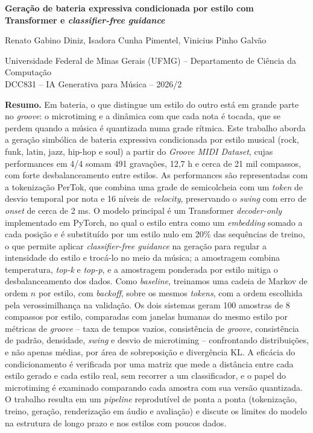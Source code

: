 \documentclass[11pt,a4paper]{article}
\begin{document}
\begin{center}
{\large\bfseries Geração de bateria expressiva condicionada por estilo com Transformer e \textit{classifier-free guidance}}

\vspace{0.6em}
Renato Gabino Diniz, Isadora Cunha Pimentel, Vinicius Pinho Galvão

Universidade Federal de Minas Gerais (UFMG) -- Departamento de Ciência da Computação\\
DCC831 -- IA Generativa para Música -- 2026/2
\end{center}

\vspace{0.4em}
\textbf{Resumo.}
Em bateria, o que distingue um estilo do outro está em grande parte no \textit{groove}: o microtiming e a dinâmica com
que cada nota é tocada, que se perdem quando a música é quantizada numa grade rítmica. Este trabalho aborda a geração
simbólica de bateria expressiva condicionada por estilo musical (rock, funk, latin, jazz, hip-hop e soul) a partir do
\textit{Groove MIDI Dataset}, cujas performances em 4/4 somam 491 gravações, 12,7 h e cerca de 21 mil compassos,
com forte desbalanceamento entre estilos. As performances são representadas com a tokenização PerTok, que combina uma
grade de semicolcheia com um \textit{token} de desvio temporal por nota e 16 níveis de \textit{velocity}, preservando
o \textit{swing} com erro de \textit{onset} de cerca de 2 ms. O modelo principal é um Transformer
\textit{decoder-only} implementado em PyTorch, no qual o estilo entra como um \textit{embedding} somado a cada posição
e é substituído por um estilo nulo em 20\% das sequências de treino, o que permite aplicar \textit{classifier-free
guidance} na geração para regular a intensidade do estilo e trocá-lo no meio da música; a amostragem combina
temperatura, \textit{top-k} e \textit{top-p}, e a amostragem ponderada por estilo mitiga o desbalanceamento dos dados.
Como \textit{baseline}, treinamos uma cadeia de Markov de ordem $n$ por estilo, com \textit{backoff}, sobre os mesmos
\textit{tokens}, com a ordem escolhida pela verossimilhança na validação. Os dois sistemas geram 100 amostras de
8 compassos por estilo, comparadas com janelas humanas do mesmo estilo por métricas de \textit{groove} --
taxa de tempos vazios, consistência de \textit{groove}, consistência de padrão, densidade, \textit{swing} e desvio de
microtiming -- confrontando distribuições, e não apenas médias, por área de sobreposição e divergência KL. A eficácia
do condicionamento é verificada por uma matriz que mede a distância entre cada estilo gerado e cada estilo real, sem
recorrer a um classificador, e o papel do microtiming é examinado comparando cada amostra com sua versão quantizada.
O trabalho resulta em um \textit{pipeline} reprodutível de ponta a ponta (tokenização, treino, geração, renderização em
áudio e avaliação) e discute os limites do modelo na estrutura de longo prazo e nos estilos com poucos dados.
\end{document}
